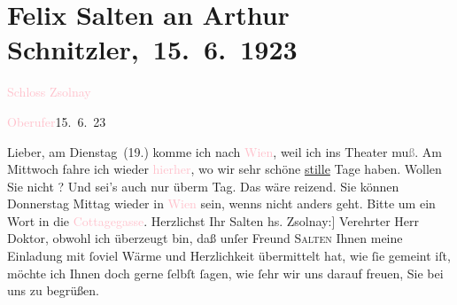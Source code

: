 

\renewcommand{\erwaehntePersonen}{Personen: Frieda Pollak, Felix Salten, Amanda von Zsolnay}
\renewcommand{\erwaehnteOrte}{Orte: Cottagegasse, Prievoz, Schloss Csáky, Wien}
\renewcommand{\erwaehnteWerke}{}
\section[ Felix Salten an Arthur Schnitzler, 15. 6. 1923]{Felix Salten an Arthur Schnitzler, 15. 6. 1923}
\nopagebreak{}
\rehead{ }\normalsize\beginnumbering{}
\toendnotes[C]{\smallbreak\pagebreak[2]}
\toendnotes[C]{\smallbreak}
\pstart
           \noindent{}\centering{}{\pb}{[}\textcolor{pink}{Schloss Zsolnay}{}\ledrightnote{\textcolor{pink}{Schloss Csáky}}{]}\pend
           
\pstart
           \raggedleft{}{\pb}\textcolor{pink}{Oberufer}{}\ledrightnote{\textcolor{pink}{Prievoz}}{ }15. 6. 23\pend
           
\pstart{}Lieber,\pend
\pstart
           am Dienstag (19.) komme ich nach \textcolor{pink}{Wien}{}\ledrightnote{\textcolor{pink}{Wien}}, weil ich ins Theater mu\textcolor{gray}{ß}. Am Mittwoch fahre ich wieder \textcolor{pink}{hierher}{}\ledrightnote{{$\rightarrow$}\textcolor{pink}{Prievoz}}, wo wir sehr schöne \uline{stille} Tage haben. Wollen Sie nicht \label{K_L02793-1v}\label{K_L02793-1h}?
               Und sei’s auch nur überm Tag. Das wäre reizend. Sie können Donnerstag{ }Mittag wieder in \textcolor{pink}{Wien}{}\ledrightnote{\textcolor{pink}{Wien}} sein, wenns
               nicht anders geht. Bitte um ein Wort in die \textcolor{pink}{Cottagegasse}{}\ledrightnote{\textcolor{pink}{Cottagegasse}}.\pend
           \pstart Herzlichst Ihr \spacefill\mbox{Salten}\pend{}{\bigskip}
\pstart{}{[}hs. Zsolnay:{]} Verehrter Herr Doktor,\pend
\pstart
           obwohl ich überzeugt bin, daß unſer Freund \textsc{Salten} Ihnen
               meine Einladung mit ſoviel Wärme und Herzlichkeit übermittelt hat, wie ſie gemeint
               iſt, möchte ich Ihnen doch gerne ſelbſt ſagen, wie ſehr {\pb}wir uns darauf freuen, Sie bei
               uns zu begrüßen.\pend
           
